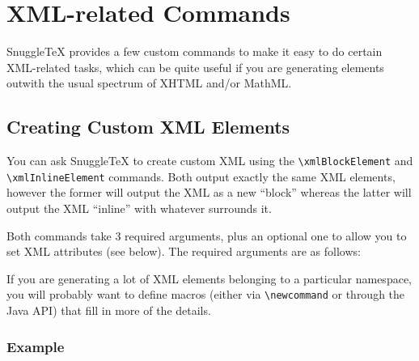 
\section*{XML-related Commands}

SnuggleTeX provides a few custom commands to make it
easy to do certain XML-related tasks, which can be quite
useful if you are generating elements outwith the usual
spectrum of XHTML and/or MathML.

\subsection*{Creating Custom XML Elements}

You can ask SnuggleTeX to create custom XML using the
\verb|\xmlBlockElement| and \verb|\xmlInlineElement|
commands. Both output exactly the same XML elements, however the former will
output the XML as a new ``block'' whereas the latter will output the XML
``inline'' with whatever surrounds it.

Both commands take 3 required arguments, plus an
optional one to allow you to set XML attributes
(see below). The required arguments are as follows:


If you are generating a lot of XML elements belonging
to a particular namespace, you will probably want to
define macros (either via \verb|\newcommand| or
through the Java API) that fill in more of the details.

\subsubsection*{Example}

